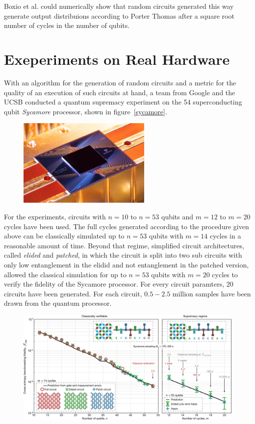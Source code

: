 Boxio et al. could numerically show that random circuits generated this way
generate output distribuions according to Porter Thomas after a square root
number of cycles in the number of qubits.

\section{Exeperiments on Real Hardware}

With an algorithm for the generation of random circuits and a metric for the
quality of an execution of such circuits at hand, a team from Google and the UCSB conducted a quantum
supremacy experiment on the 54 superconducting qubit \textit{Sycamore}
processor, shown in figure~\ref{sycamore}.

\begin{figure}[H]
  \centering
  \label{fig:sycamore}
  \includegraphics[width=0.58\textwidth]{figures/sycamore}
\end{figure}

For the experiments, circuits with $n=10$ to $n=53$ qubits and
$m=12$ to $m=20$ cycles have been used. The full cycles generated according to the procedure
given above can be classically simulated up to $n=53$ qubits with $m=14$ cycles
in a reasonable amount of time. Beyond that regime, simplified circuit
architectures, called \textit{elided} and \textit{patched}, in which the
circuit is split into two sub circuits with only low entanglement in the elidid and not
entanglement in the patched version, allowed the classical simulation for up to $n=53$ qubits with $m=20$ cycles to
verify the fidelity of the Sycamore processor. For every circuit paramters, 20
circuits have been generated. For each circuit, $0.5-2.5$ million samples have been drawn
from the quantum processor.

\begin{figure}[H]
  \centering
  \label{fig:supremacy_results}
  \includegraphics[width=\textwidth]{figures/supremacy_results}
\end{figure}

